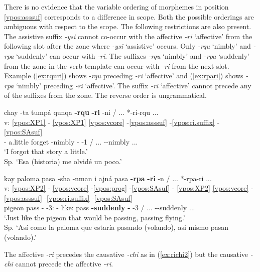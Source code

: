 \documentclass[output=paper]{langscibook}
\begin{document}
There is no evidence that the variable ordering of morphemes in position \ref{vpos:asssuf} corresponds to a difference in scope. Both the possible orderings are ambiguous with respect to the scope. The following restrictions are also present. The assistive suffix \textit{-ysi} cannot co-occur with the affective \textit{-ri} ‘affective' from the following slot after the zone where \textit{-ysi} `assistive' occurs. Only \textit{-rqu} ‘nimbly' and \textit{-rpa} ‘suddenly' can occur with \textit{-ri}. The suffixes \textit{-rqu} `nimbly' and \textit{-rpa} `suddenly' from the zone in the verb template can occur with \textit{-ri} from the next slot. Example (\ref{ex:rquri}) shows -\textit{rqu} preceding \textit{-ri} `affective' and (\ref{ex:rpari}) shows \textit{-rpa} `nimbly' preceding \textit{-ri} `affective'. The suffix \textit{-ri} `affective' cannot precede any of the suffixes from the zone. The reverse order is ungrammatical.

\ea \label{ex:rquri}{
    \glll {} chay -ta tumpá qunqa \textbf{-rqu} \textbf{-ri} -ni / ... *-ri-rqu ... \\
    v: \ref{vpos:XP1} - \ref{vpos:XP1} \ref{vpos:vcore} -\ref{vpos:asssuf} -\ref{vpos:ri.suffix} -\ref{vpos:SAsuf}   \\
    {} \Dem{} -\Acc{} a.little forget -nimbly -\Aff{} -1\Sg{} / ... -\Aff{}-nimbly ... \\
    \glt `I forgot that story a little.' \\ Sp. `Esa (historia) me olvidé un poco.' }
\z 

\ea \label{ex:rpari}{
    \glll {} kay paloma pasa -sha -nman i ajná pasa \textbf{-rpa} \textbf{-ri} -n / ... *-rpa-ri ... \\
    v: \ref{vpos:XP2} - \ref{vpos:vcore} -\ref{vpos:prog} -\ref{vpos:SAsuf} - \ref{vpos:XP2} \ref{vpos:vcore} -\ref{vpos:asssuf} -\ref{vpos:ri.suffix} -\ref{vpos:SAsuf}  \\
    {} \Dem{} pigeon pass -\Prog{} -3\Sg{}:\Cond{} - like:\Acc{} pass \textbf{-suddenly} \textbf{-\Aff{}} -3\Sg{} / ... -\Aff{}-suddenly ... \\
    \glt `Just like the pigeon that would be passing, passing flying.' \\ Sp. `Así como la paloma que estaría pasando (volando), asi mismo pasan (volando).'}
\z 

The affective \textit{-ri} precedes the causative \textit{-chi} as in (\ref{ex:richi2}) but the causative \textit{-chi} cannot precede the affective \textit{-ri}.
\end{document}
